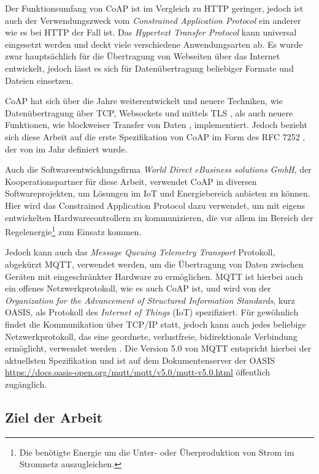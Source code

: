 Der Funktionsumfang von CoAP ist im Vergleich zu HTTP geringer, jedoch ist auch der Verwendungszweck vom \textit{Constrained Application Protocol} ein anderer wie es bei HTTP der Fall ist. Das \textit{Hypertext Transfer Protocol} kann universal eingesetzt werden und deckt viele verschiedene Anwendungsarten ab. Es wurde zwar hauptsächlich für die Übertragung von Webseiten über das Internet entwickelt, jedoch lässt es sich für Datenübertragung beliebiger Formate und Dateien einsetzen.

CoAP hat sich über die Jahre weiterentwickelt und neuere Techniken, wie Datenübertragung über TCP, Websockets und mittels TLS \autocite{RFC8323}, als auch neuere Funktionen, wie blockweiser Transfer von Daten \autocite{RFC7959}, implementiert. Jedoch bezieht sich diese Arbeit auf die erste Spezifikation von CoAP im Form des RFC 7252 \autocite{RFC7252}, der von \citeauthor{RFC7252} im Jahr \citeyear{RFC7252} definiert wurde.

Auch die Softwareentwicklungsfirma \textit{World Direct eBusiness solutions GmbH}, der Kooperationspartner für diese Arbeit, verwendet CoAP in diversen Softwareprojekten, um Lösungen im IoT und Energiebereich anbieten zu können. Hier wird das Constrained Application Protocol dazu verwendet, um mit eigens entwickelten Hardwarecontrollern zu kommunizieren, die vor allem im Bereich der Regelenergie\footnote{Die benötigte Energie um die Unter- oder Überproduktion von Strom im Stromnetz auszugleichen.} zum Einsatz kommen.

Jedoch kann auch das \textit{Message Queuing Telemetry Transport} Protokoll, abgekürzt MQTT, verwendet werden, um die Übertragung von Daten zwischen Geräten mit eingeschränkter Hardware zu ermöglichen. MQTT ist hierbei auch ein offenes Netzwerkprotokoll, wie es auch CoAP ist, und wird von der \textit{Organization for the Advancement of Structured Information Standards}, kurz OASIS, als Protokoll des \textit{Internet of Things} (IoT) spezifiziert. Für gewöhnlich findet die Kommunikation über TCP/IP statt, jedoch kann auch jedes beliebige Netzwerkprotokoll, das eine geordnete, verlustfreie, bidirektionale Verbindung ermöglicht, verwendet werden \autocite{MQTT-Wiki}. Die Version 5.0 von MQTT entspricht hierbei der aktuellsten Spezifikation und ist auf dem Dokumentenserver der OASIS \href{https://docs.oasis-open.org/mqtt/mqtt/v5.0/mqtt-v5.0.html}{https://docs.oasis-open.org/mqtt/mqtt/v5.0/mqtt-v5.0.html} öffentlich zugänglich.

\subsection{Ziel der Arbeit}
\label{subsec:ziel-der-arbeit}

